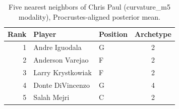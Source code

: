 \begin{table}[htbp]
  \centering\small
  \begin{tabular}{rllc}
    \toprule
    Rank & Player & Position & Archetype \\
    \midrule
    1 & Andre Iguodala & G & 2 \\
    2 & Anderson Varejao & F & 2 \\
    3 & Larry Krystkowiak & F & 2 \\
    4 & Donte DiVincenzo & G & 4 \\
    5 & Salah Mejri & C & 2 \\
    \bottomrule
  \end{tabular}
  \caption{Five nearest neighbors of Chris Paul (curvature_m5 modality), Procrustes-aligned posterior mean.}
  \label{tab:Chris_Paul_neighbors_curvature_m5}
\end{table}

